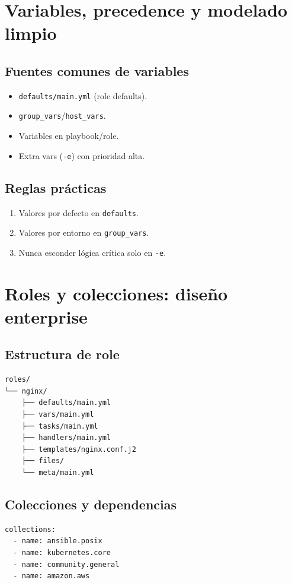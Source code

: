 \documentclass[12pt,a4paper]{article}
\begin{document}
\section{Variables, precedence y modelado limpio}

\subsection{Fuentes comunes de variables}
\begin{itemize}
  \item \texttt{defaults/main.yml} (role defaults).
  \item \texttt{group\_vars}/\texttt{host\_vars}.
  \item Variables en playbook/role.
  \item Extra vars (\texttt{-e}) con prioridad alta.
\end{itemize}

\subsection{Reglas prácticas}
\begin{enumerate}
  \item Valores por defecto en \texttt{defaults}.
  \item Valores por entorno en \texttt{group\_vars}.
  \item Nunca esconder lógica crítica solo en \texttt{-e}.
\end{enumerate}

\section{Roles y colecciones: diseño enterprise}

\subsection{Estructura de role}
\begin{lstlisting}[caption=Role reusable]
roles/
└── nginx/
    ├── defaults/main.yml
    ├── vars/main.yml
    ├── tasks/main.yml
    ├── handlers/main.yml
    ├── templates/nginx.conf.j2
    ├── files/
    └── meta/main.yml
\end{lstlisting}

\subsection{Colecciones y dependencias}
\begin{lstlisting}[caption=requirements.yml]
collections:
  - name: ansible.posix
  - name: kubernetes.core
  - name: community.general
  - name: amazon.aws
\end{lstlisting}
\end{document}
